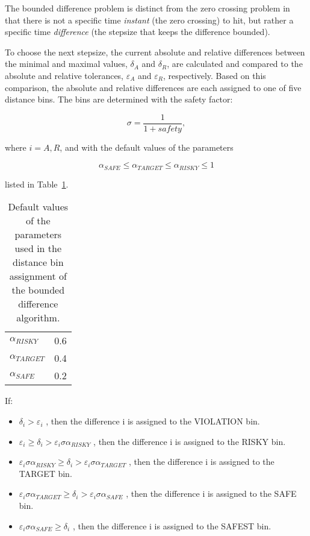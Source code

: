 \noindent The bounded difference problem is distinct from the zero crossing problem in that there is not a specific time \textit{instant} (the zero crossing) to hit, but rather a specific time \textit{difference} (the stepsize that keeps the difference bounded).

\noindent To choose the next stepsize, the current absolute and relative differences between the minimal and maximal values, $\delta_A$  and $\delta_R$, are calculated and compared to the absolute and relative tolerances, $\varepsilon_A$  and $\varepsilon_R$, respectively. Based on this comparison, the absolute and relative differences are each assigned to one of five distance bins. The bins are determined with the safety factor:

\begin{equation}
\sigma= \frac{1}{1+safety},
\end{equation}

\noindent where $i = {A, R}$, and with the default values of the parameters

\begin{equation}
\alpha_{SAFE} \leq \alpha_{TARGET} \leq \alpha_{RISKY} \leq 1
\end{equation}

\noindent listed in Table~\ref{tab:defvalbdbin}.

\begin{table}[h!]
\begin{center}
\caption{Default values of the parameters used in the distance bin assignment of the bounded difference algorithm.}
\label{tab:defvalbdbin}
\begin{tabular}{ l l }
	\hline
  $\alpha_{RISKY}$ & 0.6 \\
  $\alpha_{TARGET}$ & 0.4 \\
  $\alpha_{SAFE}$ & 0.2 \\
	\hline
\end{tabular}
\end{center}
\end{table}

\noindent If:

\begin{itemize}
\item $\delta_i > \varepsilon_i$ , then the difference i is assigned to the VIOLATION bin.
\item $\varepsilon_i \geq \delta_i > \varepsilon_i \sigma \alpha_{RISKY}$ , then the difference i is assigned to the RISKY bin.
\item $\varepsilon_i \sigma \alpha_{RISKY} \geq \delta_i > \varepsilon_i \sigma \alpha_{TARGET}$ , then the difference i is assigned to the TARGET bin.
\item $\varepsilon_i \sigma \alpha_{TARGET} \geq \delta_i > \varepsilon_i \sigma \alpha_{SAFE}$ , then the difference i is assigned to the SAFE bin.
\item $\varepsilon_i \sigma \alpha_{SAFE} \geq \delta_i$ , then the difference i is assigned to the SAFEST bin. 
\end{itemize}

